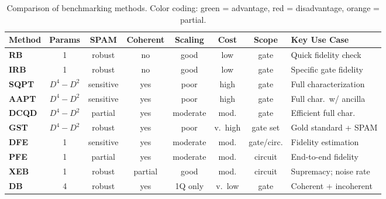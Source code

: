 \documentclass[10pt,a4paper]{article}
\begin{document}
\begin{table}[H]
\centering
\small
\renewcommand{\arraystretch}{1.15}
\begin{tabularx}{\textwidth}{l|c|c|c|c|c|c|X}
\toprule
\textbf{Method} & \textbf{Params} & \textbf{SPAM} & \textbf{Coherent} & \textbf{Scaling} & \textbf{Cost} & \textbf{Scope} & \textbf{Key Use Case} \\
\midrule
\textcolor{deepblue}{\textbf{RB}} & 1 & \textcolor{progreen}{robust} & \textcolor{conred}{no} & good & low & gate & Quick fidelity check \\
\textcolor{deepblue}{\textbf{IRB}} & 1 & \textcolor{progreen}{robust} & \textcolor{conred}{no} & good & low & gate & Specific gate fidelity \\
\textcolor{deepblue}{\textbf{SQPT}} & $D^4{-}D^2$ & \textcolor{conred}{sensitive} & \textcolor{progreen}{yes} & poor & high & gate & Full characterization \\
\textcolor{deepblue}{\textbf{AAPT}} & $D^4{-}D^2$ & \textcolor{conred}{sensitive} & \textcolor{progreen}{yes} & poor & high & gate & Full char.\ w/ ancilla \\
\textcolor{deepblue}{\textbf{DCQD}} & $D^4{-}D^2$ & \textcolor{keyorange}{partial} & \textcolor{progreen}{yes} & moderate & mod. & gate & Efficient full char. \\
\textcolor{deepblue}{\textbf{GST}} & $D^4{-}D^2$ & \textcolor{progreen}{robust} & \textcolor{progreen}{yes} & poor & v.\ high & gate set & Gold standard + SPAM \\
\textcolor{deepblue}{\textbf{DFE}} & 1 & \textcolor{conred}{sensitive} & \textcolor{progreen}{yes} & moderate & mod. & gate/circ. & Fidelity estimation \\
\textcolor{deepblue}{\textbf{PFE}} & 1 & \textcolor{keyorange}{partial} & \textcolor{progreen}{yes} & moderate & mod. & circuit & End-to-end fidelity \\
\textcolor{deepblue}{\textbf{XEB}} & 1 & \textcolor{progreen}{robust} & \textcolor{conred}{partial} & good & mod. & circuit & Supremacy; noise rate \\
\textcolor{alertred}{\textbf{DB}} & 4 & \textcolor{progreen}{robust} & \textcolor{progreen}{yes} & 1Q only & \textcolor{progreen}{v.\ low} & gate & Coherent + incoherent \\
\bottomrule
\end{tabularx}
\caption{Comparison of benchmarking methods. Color coding: \textcolor{progreen}{green} = advantage, \textcolor{conred}{red} = disadvantage, \textcolor{keyorange}{orange} = partial.}
\end{table}
\end{document}
